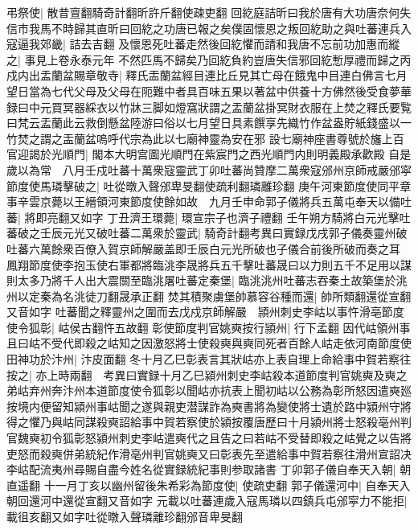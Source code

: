 弔祭使|{
	散昔亶翻騎奇計翻昕許斤翻使疎吏翻}
回紇庭詰昕曰我於唐有大功唐奈何失信市我馬不時歸其直昕曰回紇之功唐已報之矣僕固懷恩之叛回紇助之與吐蕃連兵入寇逼我郊畿|{
	詰去吉翻}
及懷恩死吐蕃走然後回紇懼而請和我唐不忘前功加惠而縱之|{
	事見上卷永泰元年}
不然匹馬不歸矣乃回紇負約豈唐失信邪回紇慙厚禮而歸之丙戍内出盂蘭盆賜章敬寺|{
	釋氏㿻蘭盆經目連比丘見其亡母在餓鬼中目連白佛言七月望日當為七代父母及父母在阨難中者具百味五果以著盆中供養十方佛然後受食夢華録曰中元買冥器綵衣以竹牀三脚如燈窩狀謂之盂蘭盆掛冥財衣服在上焚之釋氏要覧曰梵云盂蘭此云救倒懸盆陸游曰俗以七月望日具素饌享先織竹作盆盎貯紙錢盛以一竹焚之謂之㿻蘭盆嗚呼代宗為此以七廟神靈為安在邪}
設七廟神座書尊號於旛上百官迎謁於光順門|{
	閣本大明宫圖光順門在紫宸門之西光順門内則明義殿承歡殿}
自是歲以為常　八月壬戍吐蕃十萬衆寇靈武丁卯吐蕃尚贊摩二萬衆寇邠州京師戒嚴邠寜節度使馬璘擊破之|{
	吐從暾入聲邠卑旻翻使疏利翻璘離珍翻}
庚午河東節度使同平章事辛雲京薨以王縉領河東節度使餘如故　九月壬申命郭子儀將兵五萬屯奉天以備吐蕃|{
	將即亮翻又如字}
丁丑濟王環薨|{
	環宣宗子也濟子禮翻}
壬午朔方騎將白元光擊吐蕃破之壬辰元光又破吐蕃二萬衆於靈武|{
	騎奇計翻考異曰實録戊戌郭子儀奏靈州破吐蕃六萬餘衆百僚入賀京師解嚴盖即壬辰白元光所破也子儀合前後所破而奏之耳}
鳳翔節度使李抱玉使右軍都將臨洮李晟將兵五千擊吐蕃晟曰以力則五千不足用以謀則太多乃將千人出大震關至臨洮屠吐蕃定秦堡|{
	臨洮洮州吐蕃志吞秦土故築堡於洮州以定秦為名洮徒刀翻晟承正翻}
焚其積聚虜堡帥慕容谷種而還|{
	帥所類翻還從宣翻又音如字}
吐蕃聞之釋靈州之圍而去戊戍京師解嚴　頴州刺史李岵以事忤滑亳節度使令狐彰|{
	岵侯古翻忤五故翻}
彰使節度判官姚奭按行頴州|{
	行下孟翻}
因代岵領州事且曰岵不受代即殺之岵知之因激怒將士使殺奭與奭同死者百餘人岵走依河南節度使田神功於汴州|{
	汴皮面翻}
冬十月乙巳彰表言其狀岵亦上表自理上命給事中賀若察往按之|{
	亦上時兩翻　考異曰實録十月乙巳潁州刺史李岵殺本道節度判官姚奭及奭之弟岵弃州奔汴州本道節度使令狐彰以聞岵亦抗表上聞初岵以公務為彰所怒因遣奭廵按境内便留知潁州事岵聞之遂與親吏潜謀詐為奭書將為變使將士遺於路中潁州守將得之懼乃與岵同謀殺奭詔給事中賀若察使於潁按覆唐歷曰十月潁州將士怒殺亳州判官魏奭初令狐彰怒潁州刺史李岵遣奭代之且告之曰若岵不受替即殺之岵覺之以告將吏怒而殺奭併弟統紀作滑亳州判官姚奭又曰彰表先至遣給事中賀若察往滑州宣詔决李岵配流夷州尋賜自盡今姓名從實録統紀事則参取諸書}
丁卯郭子儀自奉天入朝|{
	朝直遥翻}
十一月丁亥以幽州留後朱希彩為節度使|{
	使疏吏翻}
郭子儀還河中|{
	自奉天入朝回還河中還從宣翻又音如字}
元載以吐蕃連歲入寇馬璘以四鎮兵屯邠寜力不能拒|{
	載徂亥翻又如字吐從暾入聲璘離珍翻邠音卑旻翻}
